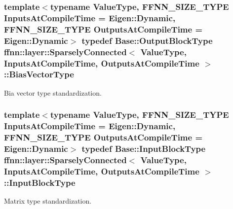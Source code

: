 \hypertarget{classffnn_1_1layer_1_1_sparsely_connected_ad2d566cbb6c54c8723d79737075b4a00}{
\subsubsection[{Bias\-Vector\-Type}]{\setlength{\rightskip}{0pt plus 5cm}template$<$typename Value\-Type, F\-F\-N\-N\-\_\-\-S\-I\-Z\-E\-\_\-\-T\-Y\-P\-E Inputs\-At\-Compile\-Time = Eigen\-::\-Dynamic, F\-F\-N\-N\-\_\-\-S\-I\-Z\-E\-\_\-\-T\-Y\-P\-E Outputs\-At\-Compile\-Time = Eigen\-::\-Dynamic$>$ typedef {\bf Base\-::\-Output\-Block\-Type} {\bf ffnn\-::layer\-::\-Sparsely\-Connected}$<$ Value\-Type, Inputs\-At\-Compile\-Time, Outputs\-At\-Compile\-Time $>$\-::{\bf Bias\-Vector\-Type}}}\label{classffnn_1_1layer_1_1_sparsely_connected_ad2d566cbb6c54c8723d79737075b4a00}


Bia vector type standardization. 

\hypertarget{classffnn_1_1layer_1_1_sparsely_connected_ad90fd9b4c687e4dc515cf8ca2796043c}{
\subsubsection[{Input\-Block\-Type}]{\setlength{\rightskip}{0pt plus 5cm}template$<$typename Value\-Type, F\-F\-N\-N\-\_\-\-S\-I\-Z\-E\-\_\-\-T\-Y\-P\-E Inputs\-At\-Compile\-Time = Eigen\-::\-Dynamic, F\-F\-N\-N\-\_\-\-S\-I\-Z\-E\-\_\-\-T\-Y\-P\-E Outputs\-At\-Compile\-Time = Eigen\-::\-Dynamic$>$ typedef Base\-::\-Input\-Block\-Type {\bf ffnn\-::layer\-::\-Sparsely\-Connected}$<$ Value\-Type, Inputs\-At\-Compile\-Time, Outputs\-At\-Compile\-Time $>$\-::{\bf Input\-Block\-Type}}}\label{classffnn_1_1layer_1_1_sparsely_connected_ad90fd9b4c687e4dc515cf8ca2796043c}


Matrix type standardization. 

